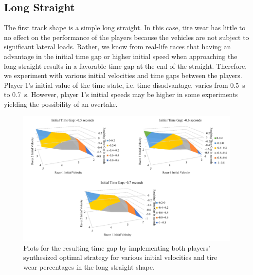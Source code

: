 \subsection{Long Straight}
The first track shape is a simple long straight. In this case, tire wear has little to no effect on the performance of the players because the vehicles are not subject to significant lateral loads. Rather, we know from real-life races that having an advantage in the initial time gap or higher initial speed when approaching the long straight results in a favorable time gap at the end of the straight. Therefore, we experiment with various initial velocities and time gaps between the players. Player 1's initial value of the time state, i.e. time disadvantage, varies from \SI{0.5}{\second} to \SI{0.7}{\second}. However, player 1's initial speeds may be higher in some experiments yielding the possibility of an overtake.

\begin{figure}
\includegraphics[width=\textwidth]{Figures/StraightExpNew.pdf}
    \caption[Results of scenarios in long straight case study.] { Plots for the resulting time gap by implementing both players' synthesized optimal strategy for various initial velocities and tire wear percentages in the long straight shape.}
    \label{fig:ls_exp}
\end{figure}

